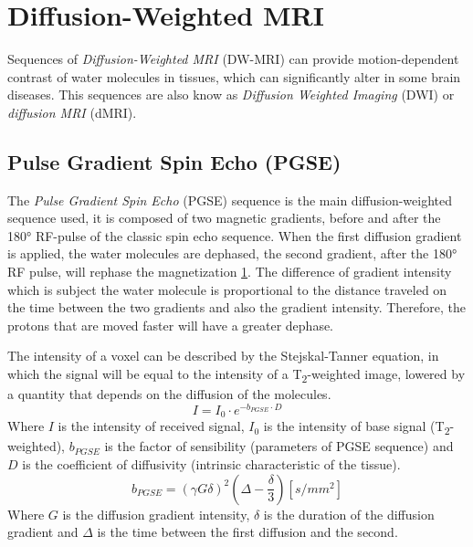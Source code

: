 \section{Diffusion-Weighted MRI}
 Sequences of \emph{Diffusion-Weighted MRI} (DW-MRI) can provide motion-dependent contrast of water molecules in tissues, which can significantly alter in some brain diseases. This sequences are also know as \emph{Diffusion Weighted Imaging} (DWI) or \emph{diffusion MRI} (dMRI). 
 \subsection{Pulse Gradient Spin Echo (PGSE)}
 The \emph{Pulse Gradient Spin Echo} (PGSE) sequence is the main diffusion-weighted sequence used, it is composed of two magnetic gradients, before and after the 180° RF-pulse of the classic spin echo sequence. When the first diffusion gradient is applied, the water molecules are dephased, the second gradient, after the 180° RF pulse, will rephase the magnetization \ref{fig:PGSE}. The difference of gradient intensity which is subject the water molecule is proportional to the distance traveled on the time between the two gradients and also the gradient intensity. Therefore, the protons that are moved faster will have a greater dephase.

 The intensity of a voxel can be described by the Stejskal-Tanner equation, in which the signal will be equal to the intensity of a T\textsubscript{2}-weighted image, lowered by a quantity that depends on the diffusion of the molecules.
 \begin{equation}
    I = I_0 \cdot e^{-b_{PGSE} \cdot D}
 \end{equation}
 Where $I$ is the intensity of received signal, $I_0$ is the intensity of base signal (T\textsubscript{2}-weighted), $b_{PGSE}$ is the factor of sensibility (parameters of PGSE sequence) and $D$ is the coefficient of diffusivity (intrinsic characteristic of the tissue).
 \begin{equation}
    b_ {PGSE} = (\gamma G \delta)^{2}(\Delta - \frac{\delta}{3}) [s/mm^2]
 \end{equation}
 Where $G$ is the diffusion gradient intensity, $\delta$ is the duration of the diffusion gradient and $\Delta$ is the time between the first diffusion and the second.

 \begin{figure}[h]
    \centering
    \caption{}
    \label{fig:PGSE}
 \end{figure}


